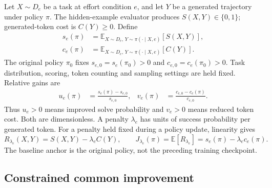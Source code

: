 \documentclass[11pt]{article}
\newcommand{\E}{\mathbb{E}}
\begin{document}
Let $X\sim D_e$ be a task at effort condition $e$, and let $Y$ be a generated trajectory under policy $\pi$. The hidden-example evaluator produces $S(X,Y)\in\{0,1\}$; generated-token cost is $C(Y)\geq0$. Define
\begin{align}
 s_e(\pi)&=\E_{X\sim D_e,\,Y\sim\pi(\cdot\mid X,e)}[S(X,Y)],\label{eq:success}\\
 c_e(\pi)&=\E_{X\sim D_e,\,Y\sim\pi(\cdot\mid X,e)}[C(Y)].\label{eq:cost}
\end{align}
The original policy $\pi_0$ fixes $s_{e,0}=s_e(\pi_0)>0$ and $c_{e,0}=c_e(\pi_0)>0$. Task distribution, scoring, token counting and sampling settings are held fixed. Relative gains are
\begin{align}
 u_e(\pi)&=\frac{s_e(\pi)-s_{e,0}}{s_{e,0}},&
 v_e(\pi)&=\frac{c_{e,0}-c_e(\pi)}{c_{e,0}}.\label{eq:relative}
\end{align}
Thus $u_e>0$ means improved solve probability and $v_e>0$ means reduced token cost. Both are dimensionless. A penalty $\lambda_e$ has units of success probability per generated token. For a penalty held fixed during a policy update, linearity gives
\begin{equation}
 R_{\lambda_e}(X,Y)=S(X,Y)-\lambda_e C(Y),\qquad
 J_{\lambda_e}(\pi)=\E[R_{\lambda_e}]=s_e(\pi)-\lambda_e c_e(\pi).
 \label{eq:scalar}
\end{equation}
The baseline anchor is the original policy, not the preceding training checkpoint.

\subsection{Constrained common improvement}
\end{document}
